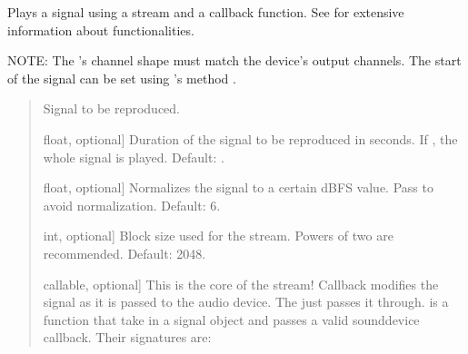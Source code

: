 \documentclass[letterpaper,10pt,english]{sphinxmanual}
\begin{document}
\begin{fulllineitems}
\label{\detokenize{modules/dsptoolbox.audio_io:dsptoolbox.audio_io.play_stream}}
\pysigstartsignatures
{}
\pysigstopsignatures
\sphinxAtStartPar
Plays a signal using a stream and a callback function.
See  for extensive information about
functionalities.

\sphinxAtStartPar
NOTE: The ’s channel shape must match the device’s
output channels. The start of the signal can be set using ’s method
.
\begin{quote}\begin{description}
\begin{description}
\sphinxlineitem{\sphinxstylestrong{signal}}{[}\sphinxtitleref{Signal}{]}
\sphinxAtStartPar
Signal to be reproduced.

\sphinxlineitem{\sphinxstylestrong{duration\_seconds}}{[}float, optional{]}
\sphinxAtStartPar
Duration of the signal to be reproduced in seconds. If , the
whole signal is played. Default: .

\sphinxlineitem{\sphinxstylestrong{normalized\_dbfs}}{[}float, optional{]}
\sphinxAtStartPar
Normalizes the signal to a certain dBFS value. Pass  to avoid
normalization. Default: \sphinxhyphen{}6.

\sphinxlineitem{\sphinxstylestrong{blocksize}}{[}int, optional{]}
\sphinxAtStartPar
Block size used for the stream. Powers of two are recommended.
Default: 2048.

\sphinxlineitem{\sphinxstylestrong{audio\_callback}}{[}callable, optional{]}
\sphinxAtStartPar
This is the core of the stream! Callback modifies the signal as it is
passed to the audio device. The  just passes it
through.  is a function that take in a signal object
and passes a valid sounddevice callback. Their signatures are:


\end{description}
\end{description}
\end{quote}
\end{fulllineitems}
\end{document}

